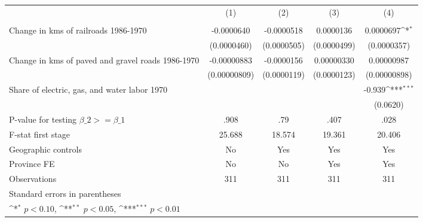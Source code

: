 {
\def\sym#1{\ifmmode^{#1}\else\(^{#1}\)\fi}
\begin{tabular}{l*{4}{c}}
\hline\hline
                &\multicolumn{1}{c}{(1)}&\multicolumn{1}{c}{(2)}&\multicolumn{1}{c}{(3)}&\multicolumn{1}{c}{(4)}\\
                &\multicolumn{1}{c}{}&\multicolumn{1}{c}{}&\multicolumn{1}{c}{}&\multicolumn{1}{c}{}\\
\hline
Change in kms of railroads 1986-1970&-0.0000640         &-0.0000518         &0.0000136         &0.0000697\sym{*}  \\
                &(0.0000460)         &(0.0000505)         &(0.0000499)         &(0.0000357)         \\
[1em]
Change in kms of paved and gravel roads 1986-1970&-0.00000883         &-0.0000156         &0.00000330         &0.00000987         \\
                &(0.00000809)         &(0.0000119)         &(0.0000123)         &(0.00000898)         \\
[1em]
Share of electric, gas, and water labor 1970&                  &                  &                  &   -0.939\sym{***}\\
                &                  &                  &                  & (0.0620)         \\
\hline
P-value for testing $\beta\_{2} >= \beta\_{1}$&     .908         &      .79         &     .407         &     .028         \\
F-stat first stage&   25.688         &   18.574         &   19.361         &   20.406         \\
Geographic controls&       No         &      Yes         &      Yes         &      Yes         \\
Province FE     &       No         &       No         &      Yes         &      Yes         \\
Observations    &      311         &      311         &      311         &      311         \\
\hline\hline
\multicolumn{5}{l}{\footnotesize Standard errors in parentheses}\\
\multicolumn{5}{l}{\footnotesize \sym{*} \(p<0.10\), \sym{**} \(p<0.05\), \sym{***} \(p<0.01\)}\\
\end{tabular}
}
